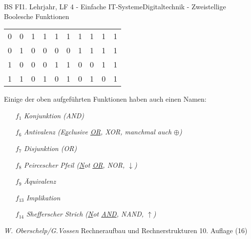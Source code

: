 \documentclass[11pt,oneside,openany,headings=optiontotoc,11pt,numbers=noenddot]{article}
\begin{document}
\begin{worksheet}{BS FI}{1. Lehrjahr, LF 4 - Einfache IT-Systeme}{Digitaltechnik - Zweistellige Boolesche Funktionen}
\begin{center}
\begin{tabular}{|cc|c|c|c|c|c|c|c|c|}
				\hline
				0 & 0 & 1 & 1 & 1 & 1 & 1 & 1 & 1 & 1\\
				0 & 1 & 0 & 0 & 0 & 0 & 1 & 1 & 1 & 1\\
				1 & 0 & 0 & 0 & 1 & 1 & 0 & 0 & 1 & 1\\
				1 & 1 & 0 & 1 & 0 & 1 & 0 & 1 & 0 & 1\\
				\hline
			\end{tabular}
		\end{center}
		Einige der oben aufgeführten Funktionen haben auch einen Namen:
		\begin{itemize}
			\item[\(f_1\)] \textit{Konjunktion (AND)}
			\item[\(f_6\)] \textit{Antivalenz (E\underline{x}clusive \underline{OR}, XOR, manchmal auch \(\oplus\))}
			\item[\(f_7\)] \textit{Disjunktion (OR)}
			\item[\(f_8\)] \textit{Peircescher Pfeil (\underline{N}ot \underline{OR}, NOR, \(\downarrow\))}
			\item[\(f_9\)] \textit{Äquivalenz}
			\item[\(f_{13}\)] \textit{Implikation}
			\item[\(f_{14}\)] \textit{Shefferscher Strich (\underline{N}ot \underline{AND}, NAND, \(\uparrow\))}
		\end{itemize}
		\par\bigskip\noindent
		\tiny{\color{codegray}\textit{W. Oberschelp/G.Vossen} Rechneraufbau und Rechnerstrukturen 10. Auflage (16)}
	\end{worksheet}
\end{document}
